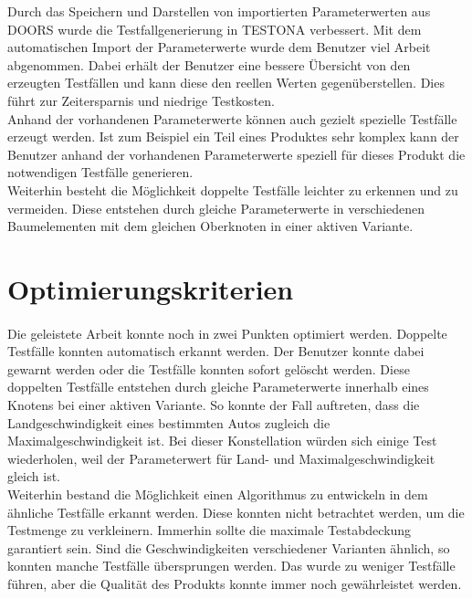 Durch das Speichern und Darstellen von importierten Parameterwerten aus DOORS wurde die Testfallgenerierung in TESTONA verbessert. Mit dem automatischen Import der Parameterwerte wurde dem Benutzer viel Arbeit abgenommen. Dabei erhält der Benutzer eine bessere Übersicht von den erzeugten Testfällen und kann diese den reellen Werten gegenüberstellen. Dies führt zur Zeitersparnis und niedrige Testkosten.\\


Anhand der vorhandenen Parameterwerte können auch gezielt spezielle Testfälle erzeugt werden. Ist zum Beispiel ein Teil eines Produktes sehr komplex kann der Benutzer anhand der vorhandenen Parameterwerte speziell für dieses Produkt die notwendigen Testfälle generieren.\\


Weiterhin besteht die Möglichkeit doppelte Testfälle leichter zu erkennen und zu vermeiden. Diese entstehen durch gleiche Parameterwerte in verschiedenen Baumelementen mit dem gleichen Oberknoten in einer aktiven Variante.\\




\newpage
\section{Optimierungskriterien}
\paragraph{}
Die geleistete Arbeit konnte noch in zwei Punkten optimiert werden. Doppelte Testfälle konnten automatisch erkannt werden. Der Benutzer konnte dabei gewarnt werden oder die Testfälle konnten sofort gelöscht werden. Diese doppelten Testfälle entstehen durch gleiche Parameterwerte innerhalb eines Knotens bei einer aktiven Variante. So konnte der Fall auftreten, dass die Landgeschwindigkeit eines bestimmten Autos zugleich die Maximalgeschwindigkeit ist. Bei dieser Konstellation würden sich einige Test wiederholen, weil der Parameterwert für Land- und Maximalgeschwindigkeit gleich ist.\\


Weiterhin bestand die Möglichkeit einen Algorithmus zu entwickeln in dem ähnliche Testfälle erkannt werden. Diese konnten nicht betrachtet werden, um die Testmenge zu verkleinern. Immerhin sollte die maximale Testabdeckung garantiert sein. Sind die Geschwindigkeiten verschiedener Varianten ähnlich, so konnten manche Testfälle übersprungen werden. Das wurde zu weniger Testfälle führen, aber die Qualität des Produkts konnte immer noch gewährleistet werden.